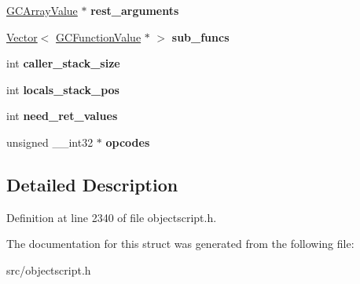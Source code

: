 \begin{DoxyCompactItemize}
\item 
\hyperlink{struct_object_script_1_1_o_s_1_1_core_1_1_g_c_array_value}{G\+C\+Array\+Value} $\ast$ {\bfseries rest\+\_\+arguments}\hypertarget{struct_object_script_1_1_o_s_1_1_core_1_1_stack_function_a63c66173dc4fe8f36bb9d5850e46f3e7}{}\label{struct_object_script_1_1_o_s_1_1_core_1_1_stack_function_a63c66173dc4fe8f36bb9d5850e46f3e7}

\item 
\hyperlink{struct_object_script_1_1_o_s_1_1_vector}{Vector}$<$ \hyperlink{struct_object_script_1_1_o_s_1_1_core_1_1_g_c_function_value}{G\+C\+Function\+Value} $\ast$ $>$ {\bfseries sub\+\_\+funcs}\hypertarget{struct_object_script_1_1_o_s_1_1_core_1_1_stack_function_a5be7d46c4b6b85ee4914a57df136014b}{}\label{struct_object_script_1_1_o_s_1_1_core_1_1_stack_function_a5be7d46c4b6b85ee4914a57df136014b}

\item 
int {\bfseries caller\+\_\+stack\+\_\+size}\hypertarget{struct_object_script_1_1_o_s_1_1_core_1_1_stack_function_afa7d18ed7f943f5bc8472619cea553fb}{}\label{struct_object_script_1_1_o_s_1_1_core_1_1_stack_function_afa7d18ed7f943f5bc8472619cea553fb}

\item 
int {\bfseries locals\+\_\+stack\+\_\+pos}\hypertarget{struct_object_script_1_1_o_s_1_1_core_1_1_stack_function_a03715759153addb654c7e2f841966a4e}{}\label{struct_object_script_1_1_o_s_1_1_core_1_1_stack_function_a03715759153addb654c7e2f841966a4e}

\item 
int {\bfseries need\+\_\+ret\+\_\+values}\hypertarget{struct_object_script_1_1_o_s_1_1_core_1_1_stack_function_a3fb8cd7e73865630af9e5db9b6e8102b}{}\label{struct_object_script_1_1_o_s_1_1_core_1_1_stack_function_a3fb8cd7e73865630af9e5db9b6e8102b}

\item 
unsigned \+\_\+\+\_\+int32 $\ast$ {\bfseries opcodes}\hypertarget{struct_object_script_1_1_o_s_1_1_core_1_1_stack_function_a9040da4036270a641da2a1a2660dd16b}{}\label{struct_object_script_1_1_o_s_1_1_core_1_1_stack_function_a9040da4036270a641da2a1a2660dd16b}

\end{DoxyCompactItemize}


\subsection{Detailed Description}


Definition at line 2340 of file objectscript.\+h.



The documentation for this struct was generated from the following file\+:\begin{DoxyCompactItemize}
\item 
src/objectscript.\+h\end{DoxyCompactItemize}
